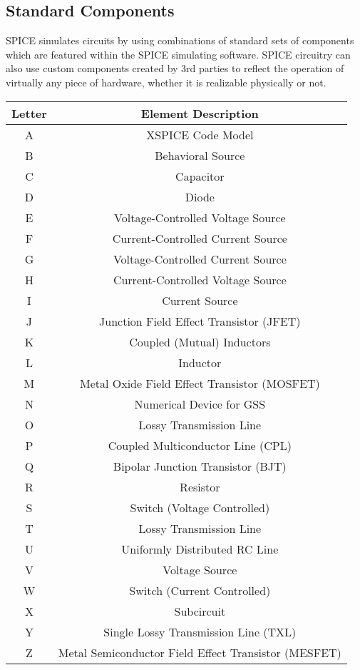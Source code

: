 \documentclass{article}
\begin{document}
\subsection{Standard Components}
SPICE simulates circuits by using combinations of standard sets of components which are featured within the SPICE simulating software. SPICE circuitry can also use custom components created by 3rd parties to reflect the operation of virtually any piece of hardware, whether it is realizable physically or not.  
\begin{center}
\begin{tabular}{||c|c||}
\hline
Letter & Element Description \\
\hline \hline
A & XSPICE Code Model \\
\hline
B & Behavioral Source \\
\hline
C & Capacitor \\
\hline
D & Diode \\
\hline
E & Voltage-Controlled Voltage Source \\
\hline
F & Current-Controlled Current Source \\
\hline
G & Voltage-Controlled Current Source \\
\hline
H & Current-Controlled Voltage Source \\
\hline
I & Current Source \\
\hline
J & Junction Field Effect Transistor (JFET) \\
\hline
K & Coupled (Mutual) Inductors \\
\hline
L & Inductor \\
\hline
M & Metal Oxide Field Effect Transistor (MOSFET) \\
\hline
N & Numerical Device for GSS \\
\hline
O & Lossy Transmission Line \\
\hline
P & Coupled Multiconductor Line (CPL) \\
\hline
Q & Bipolar Junction Transistor (BJT) \\
\hline
R & Resistor \\
\hline
S & Switch (Voltage Controlled) \\
\hline
T & Lossy Transmission Line \\
\hline
U & Uniformly Distributed RC Line \\
\hline
V & Voltage Source \\
\hline
W & Switch (Current Controlled) \\
\hline
X & Subcircuit\\
\hline
Y & Single Lossy Transmission Line (TXL) \\
\hline
Z & Metal Semiconductor Field Effect Transistor (MESFET) \\
\hline
\end{tabular}
\end{center}
\cleardoublepage
\end{document}
